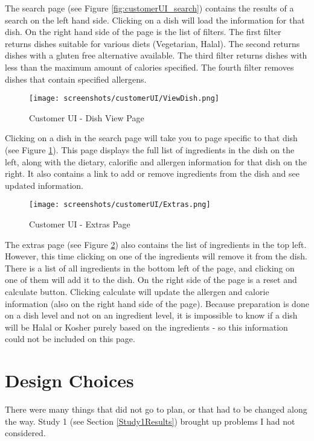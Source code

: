 The search page (see Figure \ref{fig:customerUI_search}) contains the results of a search on the left hand side. Clicking on a dish will load the information for that dish. On the right hand side of the page is the list of filters. The first filter returns dishes suitable for various diets (Vegetarian, Halal). The second returns dishes with a gluten free alternative available. The third filter returns dishes with less than the maximum amount of calories specified. The fourth filter removes dishes that contain specified allergens.

\begin{figure}[h]
    \centering
    \captionsetup{justification=centering}
    \texttt{[image: screenshots/customerUI/ViewDish.png]}
    \caption{Customer UI - Dish View Page}
    \label{fig:customerUI_view_dish}
\end{figure}

Clicking on a dish in the search page will take you to page specific to that dish (see Figure \ref{fig:customerUI_view_dish}). This page displays the full list of ingredients in the dish on the left, along with the dietary, calorific and allergen information for that dish on the right. It also contains a link to add or remove ingredients from the dish and see updated information.

\begin{figure}[h]
    \centering
    \captionsetup{justification=centering}
    \texttt{[image: screenshots/customerUI/Extras.png]}
    \caption{Customer UI - Extras Page}
    \label{fig:customerUI_extras}
\end{figure}

The extras page (see Figure \ref{fig:customerUI_extras}) also contains the list of ingredients in the top left. However, this time clicking on one of the ingredients will remove it from the dish. There is a list of all ingredients in the bottom left of the page, and clicking on one of them will add it to the dish. On the right side of the page is a reset and calculate button. Clicking calculate will update the allergen and calorie information (also on the right hand side of the page). Because preparation is done on a dish level and not on an ingredient level, it is impossible to know if a dish will be Halal or Kosher purely based on the ingredients - so this information could not be included on this page.

\section{Design Choices}
There were many things that did not go to plan, or that had to be changed along the way. Study 1 (see Section \ref{Study1Results}) brought up problems I had not considered.


